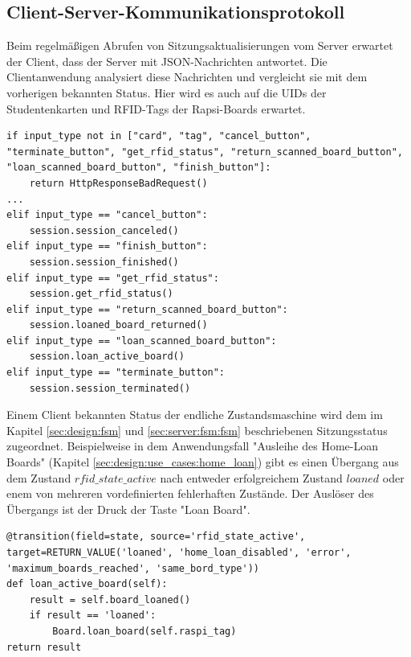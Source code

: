 \subsection{Client-Server-Kommunikationsprotokoll}
\label{sec:display_client:protokoll}
Beim regelmäßigen Abrufen von Sitzungsaktualisierungen vom Server erwartet der Client, dass der Server mit JSON-Nachrichten antwortet. Die Clientanwendung analysiert diese Nachrichten und vergleicht sie mit dem vorherigen bekannten Status. Hier wird es auch auf die UIDs der Studentenkarten und RFID-Tags der Rapsi-Boards erwartet. 
\begin{lstlisting}[caption={Sitzungsaktualisierungen mit JSON},captionpos=b]
if input_type not in ["card", "tag", "cancel_button", "terminate_button", "get_rfid_status", "return_scanned_board_button", "loan_scanned_board_button", "finish_button"]:
	return HttpResponseBadRequest()
...
elif input_type == "cancel_button":
	session.session_canceled()
elif input_type == "finish_button":
	session.session_finished()
elif input_type == "get_rfid_status":
	session.get_rfid_status()
elif input_type == "return_scanned_board_button":
	session.loaned_board_returned()
elif input_type == "loan_scanned_board_button":
	session.loan_active_board()
elif input_type == "terminate_button":
	session.session_terminated()
\end{lstlisting}
Einem Client bekannten Status der endliche Zustandsmaschine wird dem im Kapitel \ref{sec:design:fsm} und \ref{sec:server:fsm:fsm} beschriebenen Sitzungsstatus zugeordnet. Beispielweise in dem Anwendungsfall "Ausleihe des Home-Loan Boards" (Kapitel \ref{sec:design:use_cases:home_loan}) gibt es einen Übergang aus dem Zustand $rfid\_state\_active$ nach entweder erfolgreichem Zustand $loaned$ oder enem von mehreren vordefinierten fehlerhaften Zustände. Der Auslöser des Übergangs ist der Druck der Taste "Loan Board".
\begin{lstlisting}[caption={Übergang aus dem Zustand rfid\_state\_active},captionpos=b]
@transition(field=state, source='rfid_state_active', target=RETURN_VALUE('loaned', 'home_loan_disabled', 'error', 'maximum_boards_reached', 'same_bord_type'))
def loan_active_board(self):
	result = self.board_loaned()
	if result == 'loaned':
		Board.loan_board(self.raspi_tag)
return result
\end{lstlisting}

